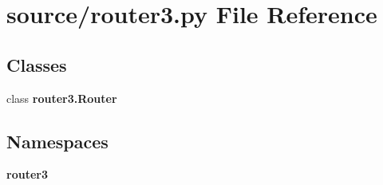 \section{source/router3.py File Reference}
\label{router3_8py}
\subsection*{Classes}
\begin{DoxyCompactItemize}
\item 
class \textbf{ router3.\+Router}
\end{DoxyCompactItemize}
\subsection*{Namespaces}
\begin{DoxyCompactItemize}
\item 
 \textbf{ router3}
\end{DoxyCompactItemize}
